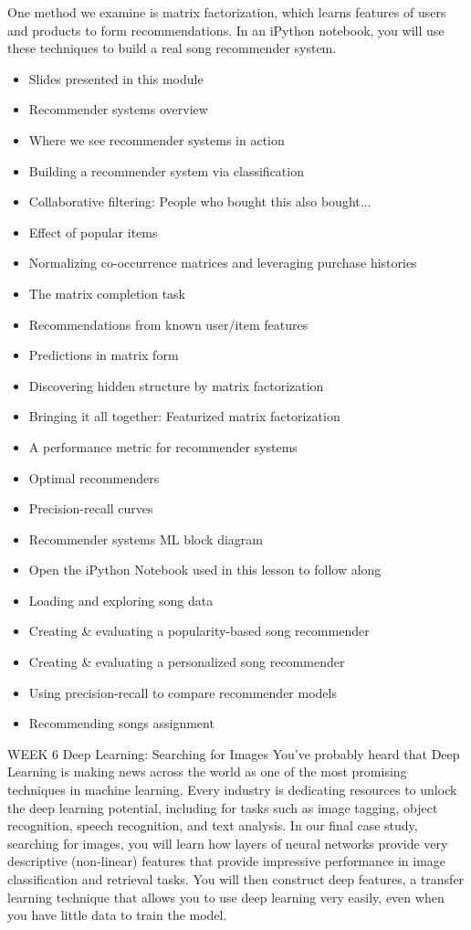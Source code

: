 One method we examine is matrix factorization, which learns features of users and products to form recommendations. In an iPython notebook, you will use these techniques to build a real song recommender system.
\begin{itemize}
\item Slides presented in this module
\item Recommender systems overview
\item Where we see recommender systems in action
\item Building a recommender system via classification
\item Collaborative filtering: People who bought this also bought...
\item Effect of popular items
\item Normalizing co-occurrence matrices and leveraging purchase histories
\item The matrix completion task
\item Recommendations from known user/item features
\item Predictions in matrix form
\item Discovering hidden structure by matrix factorization
\item Bringing it all together: Featurized matrix factorization
\item A performance metric for recommender systems
\item Optimal recommenders
\item Precision-recall curves
\item Recommender systems ML block diagram
\item Open the iPython Notebook used in this lesson to follow along
\item Loading and exploring song data
\item Creating & evaluating a popularity-based song recommender
\item Creating & evaluating a personalized song recommender
\item Using precision-recall to compare recommender models
\item Recommending songs assignment
\end{itemize}
WEEK 6
Deep Learning: Searching for Images
You’ve probably heard that Deep Learning is making news across the world as one of the most promising techniques in machine learning. Every industry is dedicating resources to unlock the deep learning potential, including for tasks such as image tagging, object recognition, speech recognition, and text analysis.
In our final case study, searching for images, you will learn how layers of neural networks provide very descriptive (non-linear) features that provide impressive performance in image classification and retrieval tasks. You will then construct deep features, a transfer learning technique that allows you to use deep learning very easily, even when you have little data to train the model.

